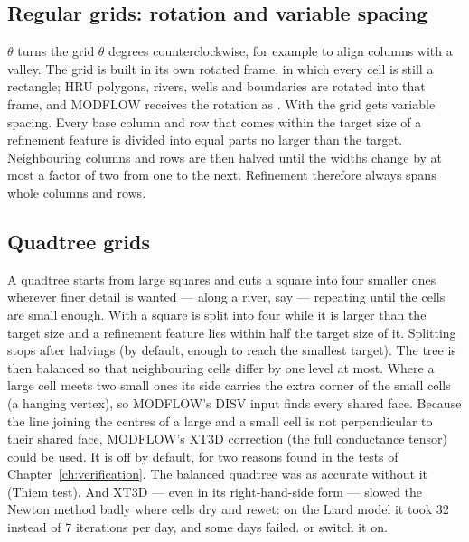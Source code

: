 \subsection{Regular grids: rotation and variable spacing}
 $\theta$ turns the grid $\theta$ degrees counterclockwise, for example to align columns with a valley.
The grid is built in its own rotated frame, in which every cell is still a rectangle; HRU polygons, rivers, wells and
boundaries are rotated into that frame, and MODFLOW receives the rotation as . With  the grid gets variable spacing. Every base column and row that comes within the target size of a
refinement feature is divided into equal parts no larger than the target. Neighbouring columns and rows are then halved
until the widths change by at most a factor of two from one to the next. Refinement therefore always spans whole columns and rows.

\subsection{Quadtree grids}
A quadtree starts from large squares and cuts a square into four smaller ones wherever finer detail is wanted --- along a
river, say --- repeating until the cells are small enough. With  a square is split into four while it is larger than the target size and a refinement feature
lies within half the target size of it. Splitting stops after  halvings (by default, enough to
reach the smallest target). The tree is then balanced so that neighbouring cells differ by one level at most. Where a large cell meets two
small ones its side carries the extra corner of the small cells (a hanging vertex), so MODFLOW's DISV input finds every
shared face. Because the line joining the centres of a large and a small cell is not perpendicular to their shared face,
MODFLOW's XT3D correction (the full conductance tensor) could be used. It is off by default, for two reasons found in the tests of Chapter~\ref{ch:verification}. The balanced quadtree was as
accurate without it (Thiem test). And XT3D --- even in its right-hand-side form --- slowed the Newton method badly where cells
dry and rewet: on the Liard model it took 32 instead of 7 iterations per day, and some days failed.  or  switch it on.

